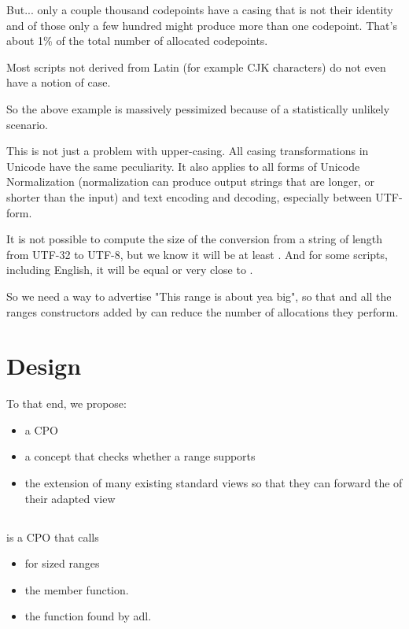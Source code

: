 \documentclass{wg21}
\begin{document}
But... only a couple thousand codepoints have a casing that is not their identity and of those only a few hundred might produce more than
one codepoint. That's about 1\% of the total number of allocated codepoints.

Most scripts not derived from Latin (for example CJK characters) do not even have a notion of case.

So the above example is massively pessimized because of a statistically unlikely scenario.

This is not just a problem with upper-casing. All casing transformations in Unicode have the same peculiarity.
It also applies to all forms of Unicode Normalization (normalization can produce output strings that are longer, or shorter than the input)
and text encoding and decoding, especially between UTF-form.

It is not possible to compute the size of the conversion from a string of length  from UTF-32 to UTF-8, but we know it will be at least .
And for some scripts, including English, it will be equal or very close to .


So we need a way to advertise "This range is about yea big", so that  and all the ranges constructors added by 
can reduce the number of allocations they perform.

\section{Design}

To that end, we propose:

\begin{itemize}
\item a  CPO
\item a  concept that checks whether a range supports 
\item the extension of many existing standard views so that they can forward the  of their adapted view
\end{itemize}

\subsection{}

 is a CPO that calls
\begin{itemize}
    \item {} for sized ranges
    \item the  member function.
    \item the  function found by adl.
\end{itemize}
\end{document}
